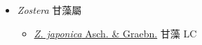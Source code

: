 
  \begin{itemize}
 \item[] \textit{Zostera} 甘藻屬
                    
  \begin{itemize}
        \item[] \href{http://www.theplantlist.org/tpl1.1/search?q=Zostera+japonica}{\textit{Z. japonica} Asch. \& Graebn.}   甘藻 LC
  \end{itemize}
  \end{itemize}
